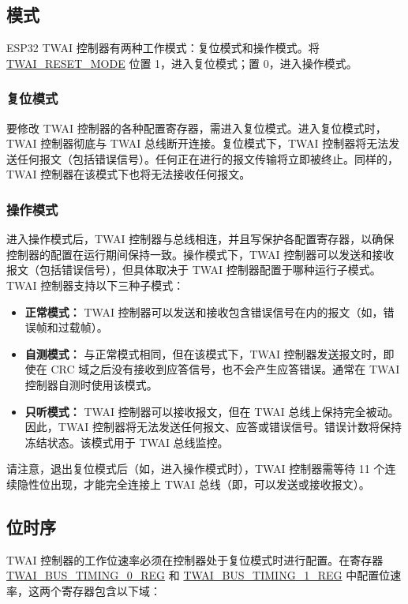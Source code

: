 \documentclass[main\_\_CN.tex]{subfiles}
\begin{document}
\subsection{模式}
\label{subsubsec:modes}
ESP32 TWAI 控制器有两种工作模式：复位模式和操作模式。将 \hyperref[fielddesc:TWAIRESETMODE]{TWAI\_RESET\_MODE} 位置 1，进入复位模式；置 0，进入操作模式。

\subsubsection{复位模式}
要修改 TWAI 控制器的各种配置寄存器，需进入复位模式。进入复位模式时，TWAI 控制器彻底与 TWAI 总线断开连接。复位模式下，TWAI 控制器将无法发送任何报文（包括错误信号）。任何正在进行的报文传输将立即被终止。同样的，TWAI 控制器在该模式下也将无法接收任何报文。

\subsubsection{操作模式}
进入操作模式后，TWAI 控制器与总线相连，并且写保护各配置寄存器，以确保控制器的配置在运行期间保持一致。操作模式下，TWAI 控制器可以发送和接收报文（包括错误信号），但具体取决于 TWAI 控制器配置于哪种运行子模式。TWAI 控制器支持以下三种子模式：

\begin{itemize}
    \item {\bfseries 正常模式：} TWAI 控制器可以发送和接收包含错误信号在内的报文（如，错误帧和过载帧）。
    \item {\bfseries 自测模式：} 与正常模式相同，但在该模式下，TWAI 控制器发送报文时，即使在 CRC 域之后没有接收到应答信号，也不会产生应答错误。通常在 TWAI 控制器自测时使用该模式。
    \item {\bfseries 只听模式：} TWAI 控制器可以接收报文，但在 TWAI 总线上保持完全被动。因此，TWAI 控制器将无法发送任何报文、应答或错误信号。错误计数将保持冻结状态。该模式用于 TWAI 总线监控。
\end{itemize}

请注意，退出复位模式后（如，进入操作模式时），TWAI 控制器需等待 11 个连续隐性位出现，才能完全连接上 TWAI 总线（即，可以发送或接收报文）。

\subsection{位时序}
TWAI 控制器的工作位速率必须在控制器处于复位模式时进行配置。在寄存器 \\\hyperref[regdesc:TWAIBUSTIMING0REG]{TWAI\_BUS\_TIMING\_0\_REG} 和 \hyperref[regdesc:TWAIBUSTIMING1REG]{TWAI\_BUS\_TIMING\_1\_REG} 中配置位速率，这两个寄存器包含以下域：
\end{document}
